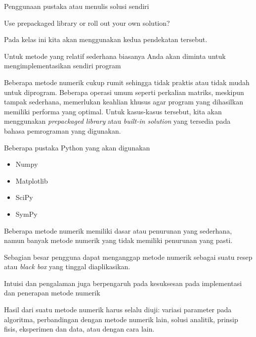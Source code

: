 \begin{frame}{Penggunaan pustaka atau menulis solusi sendiri}

Use prepackaged library or roll out your own solution?

Pada kelas ini kita akan menggunakan kedua pendekatan tersebut.

Untuk metode yang relatif sederhana biasanya Anda akan diminta
untuk mengimplementasikan sendiri program

Beberapa metode numerik cukup rumit sehingga tidak praktis atau
tidak mudah untuk diprogram.
Beberapa operasi umum
seperti perkalian matriks, meskipun tampak sederhana, memerlukan
keahlian khusus agar program yang dihasilkan memiliki performa
yang optimal. Untuk kasus-kasus tersebut, kita akan menggunakan
\textit{prepackaged library} atau \textit{built-in solution} yang
tersedia pada bahasa pemrograman yang digunakan.

\end{frame}



\begin{frame}{Beberapa pustaka Python yang akan digunakan}

\begin{itemize}
\item Numpy
\item Matplotlib
\item SciPy
\item SymPy
\end{itemize}

\end{frame}


\begin{frame}

Beberapa metode numerik memiliki dasar atau penurunan yang sederhana,
namun banyak metode numerik yang tidak memiliki penurunan yang pasti.
  
Sebagian besar pengguna dapat menganggap metode
numerik sebagai suatu resep atau \textit{black box} yang tinggal
diaplikasikan.
  
Intuisi dan pengalaman juga berpengaruh pada kesuksesan pada implementasi
dan penerapan metode numerik

Hasil dari suatu metode numerik harus selalu diuji: variasi parameter
pada algoritma, perbandingan dengan
metode numerik lain, solusi analitik, prinsip fisis, eksperimen dan data, atau
dengan cara lain.
  
\end{frame}



